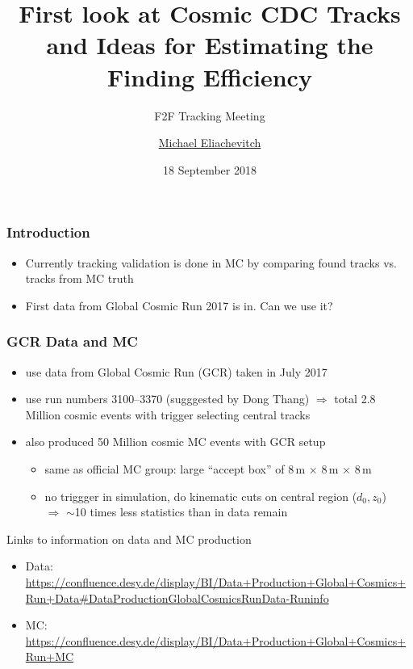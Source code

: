 \documentclass[18pt]{beamer}
\title{First look at Cosmic CDC Tracks and Ideas for Estimating the Finding Efficiency}
\subtitle{F2F Tracking Meeting}
\author{\underline{Michael Eliachevitch}}
\date{18 September 2018}
\institute{ETP - KIT}
\begin{document}

  \begin{frame}
  \titlepage
  \end{frame}

  \begin{frame}
    \frametitle{Introduction}
    \begin{itemize}
    \item Currently tracking validation is done in MC by comparing found tracks vs. tracks from MC truth
    \item First data from Global Cosmic Run 2017 is in. Can we use it? 
    \end{itemize}
  \end{frame}

  \begin{frame}
    \frametitle{GCR Data and MC}
    \begin{itemize}
    \item use data from Global Cosmic Run (GCR) taken in July 2017
    \item use run numbers 3100--3370 (sugggested by Dong Thang)
      $\Rightarrow$ total 2.8 Million cosmic events with trigger selecting central tracks\\
    \item also produced 50 Million cosmic MC events with GCR setup
      \begin{itemize}
      \item same as official MC group: large ``accept box'' of 8\,m $\times$ 8\,m $\times$ 8\,m 
      \item no triggger in simulation, do kinematic cuts on central region ($d_0, z_0$)\\
        $\Rightarrow$  $\sim$10 times less statistics than in data remain
      \end{itemize}
    \end{itemize}

    \begin{exampleblock}{Links to information on data and MC production}
      \begin{itemize}
      \item Data: \footnotesize{\url{https://confluence.desy.de/display/BI/Data+Production+Global+Cosmics+Run+Data\#DataProductionGlobalCosmicsRunData-Runinfo}}
      \item MC: \footnotesize{\url{https://confluence.desy.de/display/BI/Data+Production+Global+Cosmics+Run+MC}}
      \end{itemize}
    \end{exampleblock}
  \end{frame}
\end{document}
